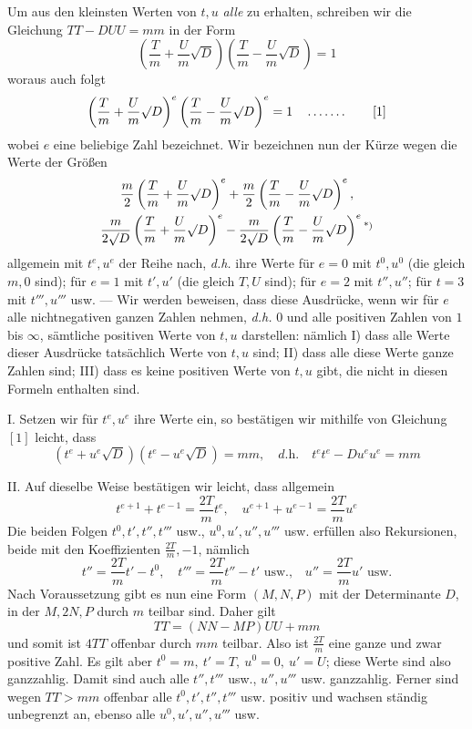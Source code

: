 Um aus den kleinsten Werten von \(t,u\) \textit{alle} zu erhalten, schreiben wir die Gleichung \(TT-DUU=mm\) in der Form
\[
\left(\frac{T}{m}+\frac{U}{m}\surd D\right)\left(\frac{T}{m}-\frac{U}{m}\surd D\right)=1
\]
woraus auch folgt
\[
\left(\frac{T}{m}+\frac{U}{m}\surd D\right)^e\left(\frac{T}{m}-\frac{U}{m}\surd D\right)^e=1\quad\mathinner{\ldotp\ldotp\ldotp\ldotp\ldotp\ldotp\ldotp}\tag*{[1]}
\]
wobei \(e\) eine beliebige Zahl bezeichnet. Wir bezeichnen nun der Kürze wegen die Werte der Größen
\begingroup{}
\[
\begin{gathered}\frac{m}{2}\left(\frac{T}{m}+\frac{U}{m}\surd D\right)^e+\frac{m}{2}\left(\frac{T}{m}-\frac{U}{m}\surd D\right)^e,\\
\frac{m}{2\surd D}\left(\frac{T}{m}+\frac{U}{m}\surd D\right)^e-\frac{m}{2\surd D}\left(\frac{T}{m}-\frac{U}{m}\surd D\right)^e\text{\textsuperscript{*)}}\end{gathered}
\]
\endgroup
allgemein mit \(t^e,u^e\) der Reihe nach, \textit{d.h.} ihre Werte für \(e=0\) mit \(t^0,u^0\) (die gleich \(m,0\) sind); für \(e=1\) mit \(t',u'\) (die gleich \(T,U\) sind); für \(e=2\) mit \(t'',u''\); für \(t=3\) mit \(t''',u'''\) usw. --- Wir werden beweisen, dass diese Ausdrücke, wenn wir für \(e\) alle nichtnegativen ganzen Zahlen nehmen, \textit{d.h.} \(0\) und alle positiven Zahlen von \(1\) bis \(\infty\), sämtliche positiven Werte von \(t,u\) darstellen: nämlich I) dass alle Werte dieser Ausdrücke
tatsächlich Werte von \(t,u\) sind; II) dass alle diese Werte ganze Zahlen sind; III) dass es keine positiven Werte von \(t,u\) gibt, die nicht in diesen Formeln enthalten sind.

I. Setzen wir für \(t^e,u^e\) ihre Werte ein, so bestätigen wir mithilfe von Gleichung~\([1]\) leicht, dass
\[
(t^e+u^e\surd D)(t^e-u^e\surd D)=mm,\quad \textit{d.h.}\quad t^e t^e-Du^e u^e=mm
\]

II. Auf dieselbe Weise bestätigen wir leicht, dass allgemein
\[
t^{e+1}+t^{e-1}=\frac{2T}{m}t^e,\quad u^{e+1}+u^{e-1}=\frac{2T}{m}u^e
\]
Die beiden Folgen \(t^0,t',t'',t'''\) usw., \(u^0,u',u'',u'''\) usw. erfüllen also Rekursionen, beide mit den Koeffizienten \(\frac{2T}{m},-1\), nämlich
\[
t''=\frac{2T}{m}t'-t^0,\quad t'''=\frac{2T}{m}t''-t'\text{ usw.,}\quad u''=\frac{2T}{m}u'\text{ usw.}
\]
Nach Voraussetzung gibt es nun eine Form \((M,N,P)\) mit der Determinante \(D\), in der \(M,2N,P\) durch \(m\) teilbar sind. Daher gilt
\[
TT=(NN-MP)UU+mm
\]
und somit ist \(4TT\) offenbar durch \(mm\) teilbar. Also ist \(\frac{2T}{m}\) eine ganze und zwar positive Zahl. Es gilt aber \(t^0=m,\ t'=T,\ u^0=0,\ u'=U\); diese Werte sind also ganzzahlig. Damit sind auch alle \(t'',t'''\) usw., \(u'',u'''\) usw. ganzzahlig. Ferner sind wegen \(TT>mm\) offenbar alle \(t^0,t',t'',t'''\) usw. positiv und wachsen ständig unbegrenzt an, ebenso alle \(u^0,u',u'',u'''\) usw.

